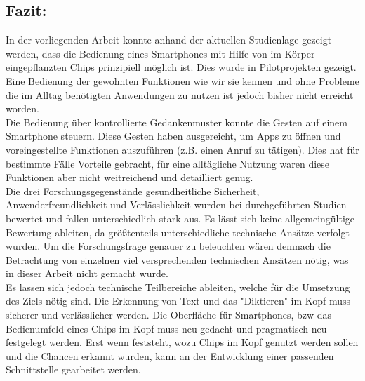 \subsection{Fazit:}
  In der vorliegenden Arbeit konnte anhand der aktuellen Studienlage gezeigt werden, dass die Bedienung eines Smartphones mit Hilfe von im Körper eingepflanzten Chips prinzipiell möglich ist. Dies wurde in Pilotprojekten gezeigt. Eine Bedienung der gewohnten Funktionen wie wir sie kennen und ohne Probleme die im Alltag benötigten Anwendungen zu nutzen ist jedoch bisher nicht erreicht worden.\\
  Die Bedienung über kontrollierte Gedankenmuster konnte die Gesten auf einem Smartphone steuern. Diese Gesten haben ausgereicht, um Apps zu öffnen und voreingestellte Funktionen auszuführen (z.B. einen Anruf zu tätigen). Dies hat für bestimmte Fälle Vorteile gebracht, für eine alltägliche Nutzung waren diese Funktionen aber nicht weitreichend und detailliert genug.\\
  Die drei Forschungsgegenstände gesundheitliche Sicherheit, Anwenderfreundlichkeit und Verlässlichkeit wurden bei  durchgeführten Studien bewertet und fallen unterschiedlich stark aus. Es lässt sich keine allgemeingültige Bewertung ableiten, da größtenteils unterschiedliche technische Ansätze verfolgt wurden. Um die Forschungsfrage genauer zu beleuchten wären demnach die Betrachtung von einzelnen viel versprechenden technischen Ansätzen nötig, was in dieser Arbeit nicht gemacht wurde.\\
  Es lassen sich jedoch technische Teilbereiche ableiten, welche für die Umsetzung des Ziels nötig sind. Die Erkennung von Text und das "Diktieren" im Kopf muss sicherer und verlässlicher werden. Die Oberfläche für Smartphones, bzw das Bedienumfeld eines Chips im Kopf muss neu gedacht und pragmatisch neu festgelegt werden. Erst wenn feststeht, wozu Chips im Kopf genutzt werden sollen und die Chancen erkannt wurden, kann an der Entwicklung einer passenden Schnittstelle gearbeitet werden.
